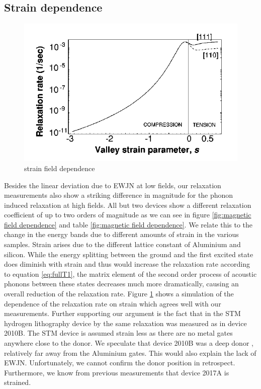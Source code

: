 \documentclass[%
 reprint,
 amsmath,amssymb,
 aps,
]{revtex4-1}
\begin{document}
\subsection{\label{sec:strain} Strain dependence}

\begin{figure}
\centering
\includegraphics[width=\columnwidth]{fig7}
\caption{
strain field dependence
}
\label{fig:strain}
\end{figure}

Besides the linear deviation due to EWJN at low fields, our relaxation measurements also show a striking difference in magnitude for the phonon induced relaxation at high fields. All but two devices show a different relaxation coefficient of up to two orders of magnitude as we can see in figure \ref{fig:magnetic field dependence} and table \ref{fig:magnetic field dependence}. 
We relate this to the change in the energy bands due to different amounts of strain in the various samples. Strain arises due to the different lattice constant of Aluminium and silicon. While the energy splitting between the ground and the first excited state does diminish with strain and thus would increase the relaxation rate according to equation \ref{eq:fullT1}, the matrix element of the second order process of acoustic phonons between these states decreases much more dramatically, causing an overall reduction of the relaxation rate.
Figure \ref{fig:strain} shows a simulation of the dependence of the relaxation rate on strain which agrees well with our measurements. Further supporting our argument is the fact that in the STM hydrogen lithography device by \cite{Watson2015} the same relaxation was measured as in device 2010B. The STM device is assumed strain less as there are no metal gates anywhere close to the donor. We speculate that device 2010B was a deep donor , relatively far away from the Aluminium gates. This would also explain the lack of EWJN. Unfortunately, we cannot confirm the donor position in retrospect. Furthermore, we know from previous measurements \cite{Laucht2015} that device 2017A is strained. 
\end{document}

